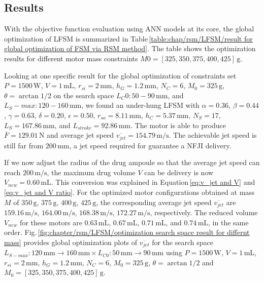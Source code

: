                 
                
                
                    

        \subsection{Results}                   \label{Chapter:RSM/LFSM/Results}        
                
            With the objective function evaluation using \acs{ANN} models at its core, the global optimization of \acs{LFSM} is summarized in Table\,\ref{table:chap/rsm/LFSM/result for global optimization of FSM via RSM method}. The table shows the optimization results for different motor mass constraints $M0 = [325, 350, 375, 400, 425]\,\mathrm{g}$.
            
            
            Looking at one specific result for the global optimization of constraints set $P=1500\,\mathrm{W}$, $V=1\,\mathrm{mL}$, $r_{si}=2\,\mathrm{mm}$, $h_G=1.2\,\mathrm{mm}$, $N_C=6$, $M_0=325\,\mathrm{g}$, $\theta = \arctan{1/2}$ on the search space $L_C0:50-90\,\mathrm{mm}$, and $L_S-max:120-160\,\mathrm{mm}$, we found an under-hung \acs{LFSM} with $\alpha=0.36$, $\beta=0.44$, $\gamma=0.63$, $\delta=0.20$, $\epsilon=0.50$, $r_{so}=8.11\,\mathrm{mm}$, $h_C=5.37\,\mathrm{mm}$, $N_S=17$, $L_S=167.86\,\mathrm{mm}$, and $L_{stroke}=92.86\,\mathrm{mm}$. The motor is able to produce $\overline{F} = 129.01\,\mathrm{N}$ and average jet speed $\overline{v_{jet}}=154.79\,\mathrm{m/s}$. The achievable jet speed is still far from $200\,\mathrm{mm}$, a jet speed required for guarantee a \acs{NFJI} delivery. 
            
            
            If we now adjust the radius of the drug ampoule so that the average jet speed can reach $200\,\mathrm{m/s}$, the maximum drug volume $V$ can be delivery is now $V_{new}=0.60\,\mathrm{mL}$. This conversion was explained in Equation\,\ref{eq:v_jet and V} and \ref{eq:v_jet and V ratio}. For the optimized motor configurations obtained at mass $M$ of $350\,\mathrm{g}$, $375\,\mathrm{g}$, $400\,\mathrm{g}$, $425\,\mathrm{g}$, the corresponding average jet speed $\overline{v_{jet}}$ are $159.16\,\mathrm{m/s}$, $164.00\,\mathrm{m/s}$, $168.38\,\mathrm{m/s}$, $172.27\,\mathrm{m/s}$, respectively. The reduced volume $V_{new}$ for these motors are $0.63\,\mathrm{mL}$, $0.67\,\mathrm{mL}$, $0.71\,\mathrm{mL}$, and $0.74\,\mathrm{mL}$, in the same order. Fig.\,\ref{fig:chapter/rsm/LFSM/optimization search space result for differnt mass} provides global optimization plots of $\overline{v_{jet}}$ for the search space $L_{S-max}:120\,\mathrm{mm}\rightarrow 160\,\mathrm{mm} \times L_{C0}:50\,\mathrm{mm}\rightarrow 90\,\mathrm{mm}$ using $P=1500\,\mathrm{W}$, $V=1\,\mathrm{mL}$, $r_{si}=2\,\mathrm{mm}$, $h_G=1.2\,\mathrm{mm}$, $N_C=6$, $M_0=325\,\mathrm{g}$, $\theta = \arctan{1/2}$ and $M_0=[325,350,375,400,425]\,\mathrm{g}$. 
 
